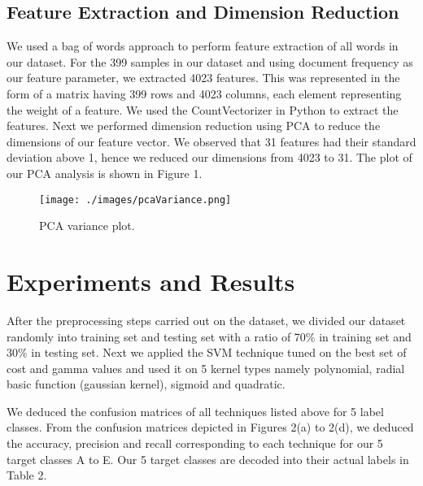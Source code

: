 \documentclass{article}
\begin{document}
\subsection{Feature Extraction and Dimension Reduction}

We used a bag of words approach to perform feature extraction of all words in our dataset. For the 399 samples in our dataset and using document frequency as our feature parameter, we extracted 4023 features. This was represented in the form of a matrix having 399 rows and 4023 columns, each element representing the weight of a feature. We used the CountVectorizer in Python to extract the features. Next we performed dimension reduction using PCA to reduce the dimensions of our feature vector. We observed that 31 features had their standard deviation above 1, hence we reduced our dimensions from 4023 to 31. The plot of our PCA analysis is shown in Figure 1.


\begin{figure}[h!]
  \centering
  \texttt{[image: ./images/pcaVariance.png]}
  \caption{PCA variance plot.}
\end{figure}


\section{Experiments and Results}
\label{experiments_results}

After the preprocessing steps carried out on the dataset, we divided our dataset randomly into training set and testing set with a ratio of 70\% in training set and 30\% in testing set. Next we applied the SVM technique tuned on the best set of cost and gamma values and used it on 5 kernel types namely polynomial, radial basic function (gaussian kernel), sigmoid and quadratic. 

We deduced the confusion matrices of all techniques listed above for 5 label classes. From the confusion matrices depicted in Figures 2(a) to 2(d), we deduced the accuracy, precision and recall corresponding to each technique for our 5 target classes A to E. Our 5 target classes are decoded into their actual labels in Table 2. 
\end{document}
